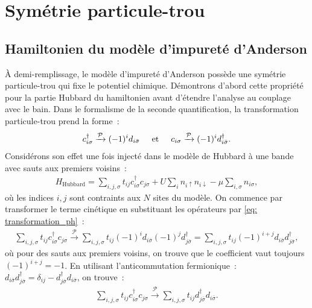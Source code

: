 \chapter{Symétrie particule-trou} \label{chap: ph-symmetry}

\section{Hamiltonien du modèle d'impureté d'Anderson} \label{sec:
particule-trou-h}

À demi-remplissage, le modèle d'impureté d'Anderson possède une symétrie
particule-trou qui fixe le potentiel chimique. Démontrons d'abord cette
propriété pour la partie Hubbard du hamiltonien avant d'étendre l'analyse au
couplage avec le bain. Dans le formalisme de la seconde quantification, la
transformation particule-trou prend la forme~:
\begin{align}
    c^\dagger_{i\sigma} \xrightarrow{\mathcal{P}} (-1)^i
    d_{i\bar{\sigma}}\hspace{0.5cm}\text{et}\hspace{0.5cm} c_{i\sigma} \xrightarrow{\mathcal{P}}
    (-1)^i d^\dagger_{i\bar{\sigma}}.
    \label{eq: transformation_ph}
\end{align}
Considérons son effet une fois injecté dans le modèle de Hubbard à une bande
avec sauts aux premiers voisins~:
\begin{align}
    H_{\text{Hubbard}} = \sum_{i,j,\sigma} t_{ij}c^\dagger_{i\sigma}c_{j\sigma}
    +
    U\sum_{i}n_{i\uparrow}n_{i\downarrow} - \mu\sum_{i,\sigma}n_{i\sigma},
\end{align}
où les indices $i,j$ sont contraints aux $N$ sites du modèle. On commence par
transformer le terme cinétique en substituant les opérateurs par
\eqref{eq: transformation_ph}~:
\begin{align}
    \sum_{i,j,\sigma} t_{ij}c^\dagger_{i\sigma}c_{j\sigma}
    \xrightarrow{\mathcal{P}} \sum_{i,j,\sigma}
    t_{ij}(-1)^i d_{i\bar{\sigma}}(-1)^j d^\dagger_{j\bar{\sigma}} =
    \sum_{i,j,\sigma} t_{ij}(-1)^{i+j} d_{i\bar{\sigma}}
    d^\dagger_{j\bar{\sigma}},
\end{align}
où pour des sauts aux premiers voisins, on trouve que le coefficient vaut
toujours $(-1)^{i+j} = -1$. En utilisant l'anticommutation fermionique~:
$d_{i\bar{\sigma}} d^\dagger_{j\bar{\sigma}} = \delta_{ij} -
d^\dagger_{j\bar{\sigma}}d_{i\bar{\sigma}}$, on trouve~:
\begin{align}
    \sum_{i,j,\sigma} t_{ij}c^\dagger_{i\sigma}c_{j\sigma}
    \xrightarrow{\mathcal{P}} \sum_{i,j,\sigma}
    t_{ij}d^\dagger_{j\bar{\sigma}}d_{i\bar{\sigma}}.
\end{align}
